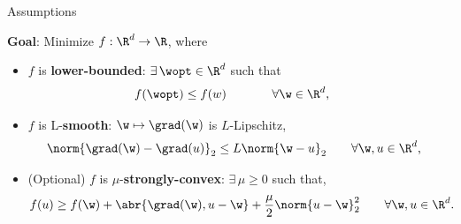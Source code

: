 \documentclass[mathserif,notheorems, hyperref={colorlinks, citecolor=blue, urlcolor=blue, linkcolor=blue}]{beamer}
\begin{document}

\begin{frame}{Assumptions}

	\textbf{Goal}: Minimize \( f : \R^d \rightarrow \R \), where
	\vspace{1ex}
	\pause
	\begin{itemize}
		\item \( f \) is \textbf{lower-bounded}: \( \exists \, \wopt \in \R^d \) such that
		      \begin{align*}
			      f(\wopt) & \leq f(w) \hspace{1.7em} \tag*{\(\forall \w \in \R^d \), }
		      \end{align*}
		      \vspace{1ex}
		      \pause

		\item \( f \) is L-\textbf{smooth}: \( \w \mapsto \grad(\w) \) is \( L \)-Lipschitz,
		      \begin{align*}
			      \norm{\grad(\w) - \grad(u)}_2 & \leq L \norm{\w - u}_2 \tag*{\(\forall \w, u \in \R^d \),}
		      \end{align*}
		      \vspace{1ex}
		      \pause

		\item (Optional) \( f \) is \( \mu \)-\textbf{strongly-convex}: \( \exists \, \mu \geq 0 \) such that,
		      \begin{align*}
			      f(u) \geq f(\w) + \abr{\grad(\w), u - \w} + \frac{\mu}{2} \norm{u - \w}^2_2 \tag*{\( \forall \w, u \in \R^d \).}
		      \end{align*}
	\end{itemize}

\end{frame}
\end{document}
